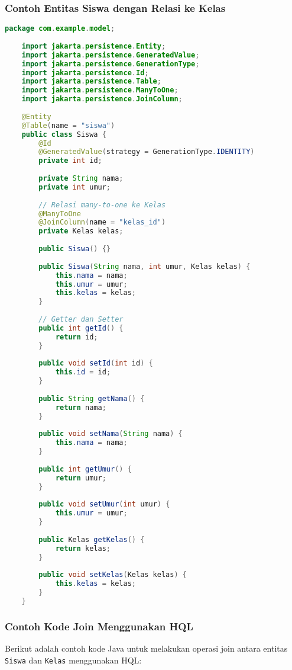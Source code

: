 \subsubsection*{Contoh Entitas Siswa dengan Relasi ke Kelas}
\begin{lstlisting}[language=Java, style=JavaStyle]
	package com.example.model;
	
	import jakarta.persistence.Entity;
	import jakarta.persistence.GeneratedValue;
	import jakarta.persistence.GenerationType;
	import jakarta.persistence.Id;
	import jakarta.persistence.Table;
	import jakarta.persistence.ManyToOne;
	import jakarta.persistence.JoinColumn;
	
	@Entity
	@Table(name = "siswa")
	public class Siswa {
		@Id
		@GeneratedValue(strategy = GenerationType.IDENTITY)
		private int id;
		
		private String nama;
		private int umur;
		
		// Relasi many-to-one ke Kelas
		@ManyToOne
		@JoinColumn(name = "kelas_id")
		private Kelas kelas;
		
		public Siswa() {}
		
		public Siswa(String nama, int umur, Kelas kelas) {
			this.nama = nama;
			this.umur = umur;
			this.kelas = kelas;
		}
		
		// Getter dan Setter
		public int getId() {
			return id;
		}
		
		public void setId(int id) {
			this.id = id;
		}
		
		public String getNama() {
			return nama;
		}
		
		public void setNama(String nama) {
			this.nama = nama;
		}
		
		public int getUmur() {
			return umur;
		}
		
		public void setUmur(int umur) {
			this.umur = umur;
		}
		
		public Kelas getKelas() {
			return kelas;
		}
		
		public void setKelas(Kelas kelas) {
			this.kelas = kelas;
		}
	}
\end{lstlisting}

\subsubsection*{Contoh Kode Join Menggunakan HQL}
Berikut adalah contoh kode Java untuk melakukan operasi join antara entitas \texttt{Siswa} dan \texttt{Kelas} menggunakan HQL:

